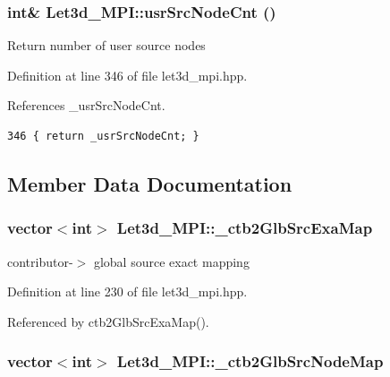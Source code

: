 \subsubsection{\setlength{\rightskip}{0pt plus 5cm}int\& Let3d\_\-MPI::usr\-Src\-Node\-Cnt ()\hspace{0.3cm}{\tt  [inline]}}\label{classLet3d__MPI_f4ce183be62f7e5d726ef9c4b6cd947f_f4ce183be62f7e5d726ef9c4b6cd947f}


Return number of user source nodes 

Definition at line 346 of file let3d\_\-mpi.hpp.

References \_\-usr\-Src\-Node\-Cnt.

\footnotesize\begin{verbatim}346 { return _usrSrcNodeCnt; }
\end{verbatim}\normalsize 




\subsection{Member Data Documentation}
\subsubsection{\setlength{\rightskip}{0pt plus 5cm}vector$<$int$>$ {\bf Let3d\_\-MPI::\_\-ctb2Glb\-Src\-Exa\-Map}\hspace{0.3cm}{\tt  [protected]}}\label{classLet3d__MPI_1d2f2fe8995d17f1e159a1384a05aebf_1d2f2fe8995d17f1e159a1384a05aebf}


contributor-$>$ global source exact mapping 

Definition at line 230 of file let3d\_\-mpi.hpp.

Referenced by ctb2Glb\-Src\-Exa\-Map().
\subsubsection{\setlength{\rightskip}{0pt plus 5cm}vector$<$int$>$ {\bf Let3d\_\-MPI::\_\-ctb2Glb\-Src\-Node\-Map}\hspace{0.3cm}{\tt  [protected]}}\label{classLet3d__MPI_5be800bde845d921fe85da282617bd20_5be800bde845d921fe85da282617bd20}


